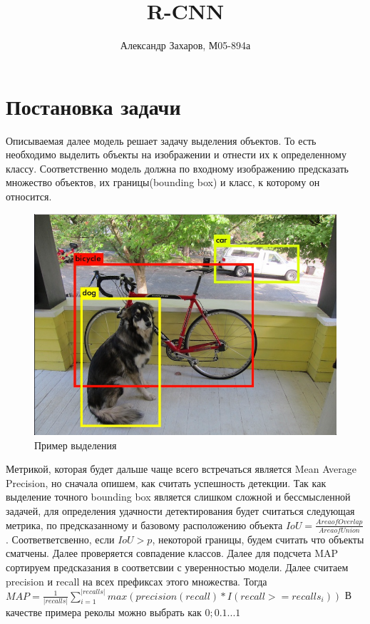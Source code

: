 \documentclass{article}
\title{R-CNN}
\author{Александр Захаров, М05-894а}
\date{}
\begin{document}
	\maketitle
	\section{Постановка задачи}
	Описываемая далее модель решает задачу выделения объектов. То есть необходимо выделить объекты на изображении и отнести их к определенному классу.  Соответственно модель должна по входному изображению предсказать множество объектов, их границы(bounding box) и класс, к которому он относится. 
	
	\begin{figure}[H]
	    \begin{center}
        \includegraphics[width=0.5\linewidth]{Image0.jpg}
        \caption{Пример выделения}
        \end{center}
    \end{figure}

	
	Метрикой, которая будет дальше чаще всего встречаться является Mean Average Precision, но сначала опишем, как считать успешность детекции. Так как выделение точного bounding box является слишком сложной и бессмысленной задачей, для определения удачности детектирования будет считаться следующая  метрика, по предсказанному и базовому расположению объекта $IoU = \frac{Area of Overlap}{Area of Union}$. Соответветсвенно, если $IoU > p$, некоторой границы, будем считать что объекты сматчены. Далее проверяется совпадение классов. Далее для подсчета MAP сортируем предсказания в соответсвии с уверенностью модели. Далее считаем precision и recall на всех префиксах этого множества. Тогда $MAP = \frac{1}{|recalls|}\sum\limits_{i=1}^{|recalls|} max(precision(recall) * I(recall >= recalls_i))$ В качестве примера реколы можно выбрать как $0;0.1 ... 1$
\end{document}
